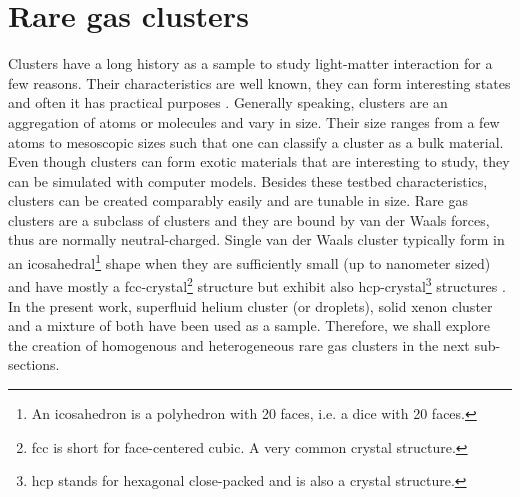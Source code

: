 \section{Rare gas clusters}\label{sec:cluster-theory}
Clusters have a long history as a sample to study light-matter interaction for a few reasons. Their characteristics are well known, they can form interesting states and often it has practical purposes \cite{Haberland-1994-Springer}. Generally speaking, clusters are an aggregation of atoms or molecules and vary in size. Their size ranges from a few atoms to mesoscopic sizes such that one can classify a cluster as a bulk material. Even though clusters can form exotic materials that are interesting to study, they can be simulated with computer models. Besides these testbed characteristics, clusters can be created comparably easily and are tunable in size. Rare gas clusters are a subclass of clusters and they are bound by van der Waals forces, thus are normally neutral-charged. Single van der Waals cluster typically form in an icosahedral\footnote{An icosahedron is a polyhedron with 20 faces, i.e. a dice with 20 faces.} shape when they are sufficiently small (up to nanometer sized) \cite{Miehle-1989-JCP} and have mostly a fcc-crystal\footnote{fcc is short for face-centered cubic. A very common crystal structure.} structure but exhibit also hcp-crystal\footnote{hcp stands for hexagonal close-packed and is also a crystal structure.} structures \cite{VanDeWaal-1993-JCP,Krainyukova-2006-TSF}. In the present work, superfluid helium cluster (or droplets), solid xenon cluster and a mixture of both have been used as a sample. Therefore, we shall explore the creation of homogenous and heterogeneous rare gas clusters in the next sub-sections.
%
%
%
